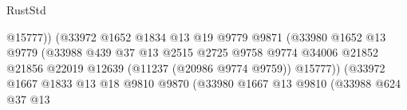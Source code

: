 \begin{lexlean}{RustStd}
\begin{coremodule}
                                                        @15777))
                                                    (@33972
                                                      @1652
                                                      @1834
                                                      @13
                                                      @19
                                                      @9779
                                                      @9871
                                                      (@33980
                                                        @1652
                                                        @13
                                                        @9779
                                                        (@33988
                                                          @439
                                                          @37
                                                          @13
                                                          @2515
                                                          @2725
                                                          @9758
                                                          @9774
                                                          @34006
                                                          @21852
                                                          @21856
                                                          @22019
                                                          @12639
                                                          (@11237 (@20986 @9774 @9759))
                                                          @15777))
                                                      (@33972
                                                        @1667
                                                        @1833
                                                        @13
                                                        @18
                                                        @9810
                                                        @9870
                                                        (@33980
                                                          @1667
                                                          @13
                                                          @9810
                                                          (@33988
                                                            @624
                                                            @37
                                                            @13

\end{coremodule}
\end{lexlean}
